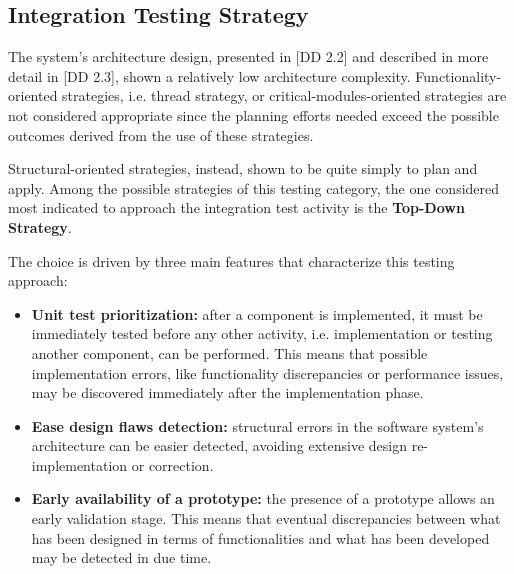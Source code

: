 \subsection{Integration Testing Strategy}
\label{sec:integration-testing-strategy}

The system's architecture design, presented in [DD 2.2] and described in more detail in [DD 2.3], shown a relatively low architecture complexity. Functionality-oriented strategies, i.e. thread strategy, or critical-modules-oriented strategies are not considered appropriate since the planning efforts needed exceed the possible outcomes derived from the use of these strategies.

Structural-oriented strategies, instead, shown to be quite simply to plan and apply. Among the possible strategies of this testing category, the one considered most indicated to approach the integration test activity is the \textbf{Top-Down Strategy}.

The choice is driven by three main features that characterize this testing approach:

\begin{itemize}
	\item \textbf{Unit test prioritization:} after a component is implemented, it must be immediately tested before any other activity, i.e. implementation or testing another component, can be performed. This means that possible implementation errors, like functionality discrepancies or performance issues, may be discovered immediately after the implementation phase.
	\item \textbf{Ease design flaws detection:} structural errors in the software system's architecture can be easier detected, avoiding extensive design re-implementation or correction.
	\item \textbf{Early availability of a prototype:} the presence of a prototype allows an early validation stage. This means that eventual discrepancies between what has been designed in terms of functionalities and what has been developed may be detected in due time.
\end{itemize}
